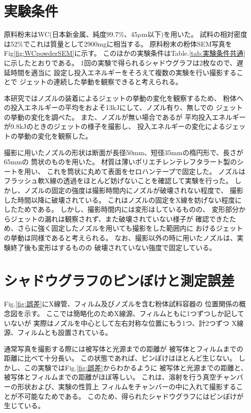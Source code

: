 \section{実験条件}\label{ジェット観察条件}

原料粉末はWC(日本新金属、純度99.7\%、45$\mu $m以下)を用いた。
試料の相対密度は52\%でこれは質量として2900mgに相当する。
原料粉末の粉体SEM写真をFig\ref{fig:WCpowderSEM}に示す。
このほかの実験条件はTable.\ref{tab:実験条件共通}に示したとおりである。
1回の実験で得られるシャドウグラフは2枚なので、遅延時間を適当に
設定し投入エネルギーをそろえて複数の実験を行い撮影することで
ジェットの連続した挙動を観察できると考えられる。

本研究ではノズルの装着によるジェットの挙動の変化を観察するため、
粉体への投入エネルギーの平均をおよそ13kJにして、ノズル有り、無しでの
ジェットの挙動の変化を調べた。
また、ノズルが無い場合であるが
平均投入エネルギーが9.8kJのときのジェットの様子を撮影し、
投入エネルギーの変化によるジェットの挙動の変化を観察した。

撮影に用いたノズルの形状は断面が長径50mm、短径35mmの楕円形で、長さが65mmの
筒状のものを用いた。
材質は薄いポリエチレンテレフタラート製のシートを用い、
これを筒状に丸めて表面をセロハンテープで固定した。
ノズルはフラッシュ軟X線の透過をほとんど妨げないことを確認して実験を行った。
しかし、ノズルの固定の強度は撮影時間内にノズルが破壊されない程度で、
撮影した時間以降に破壊されている。
これはノズルの固定をX線を妨げない程度にしたためである。
しかし、撮影時間内には変形はしているものの、
変形部分からジェットの漏れは観察されず、また破壊されていない様子が
確認できたため、さらに強く固定したノズルを用いても撮影をした範囲内に
おけるジェットの挙動は同様であると考えられる。
なお、撮影以外の時に用いたノズルは、実験終了後も変形はするものの
破壊されていない強度で固定している。

\section{シャドウグラフのピンぼけと測定誤差}

Fig.\ref{fig:誤差}にX線管、フィルム及びノズルを含む粉体試料容器の
位置関係の概念図を示す。
ここでは簡略化のためX線源、フィルムともに1つずつしか記していないが
実際はノズルを中心として左右対称な位置にもう1つ、計2つずつ
X線源、フィルムとも設置されている。

通常写真を撮影する際には被写体と光源までの距離が
被写体とフィルムまでの距離に比べて十分長い。
この状態であれば、ピンぼけはほとんど生じない。
しかし、この実験ではFig.\ref{fig:誤差}からわかるように
被写体と光源までの距離と、被写体とフィルムまでの距離がほぼ等しい。
これは、溶射を行う真空チャンバーの形状および、実験の性質上
フィルムをチャンバーの中に入れて撮影することが不可能なためである。
このため、得られたシャドウグラフにはピンぼけが生じている。

